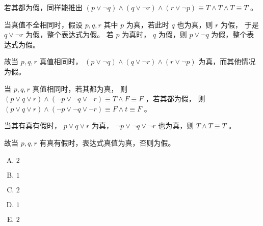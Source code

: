 {{\begin{practices}
            若其都为假，同样能推出 $(p \vee \neg q) \wedge (q \vee \neg r) \wedge (r \vee \neg p) \equiv T \wedge T \wedge T \equiv T$ 。

            当真值不全相同时，假设 $p, q, r$ 其中 $p$ 为真，若此时 $q$ 也为真，则 $r$ 为假， 于是 $q \vee \neg r$ 为假，整个表达式为假。
            若 $p$ 为真时， $q$ 为假，则 $p \vee \neg q$ 为假，整个表达式为假。

            故当 $p, q, r$ 真值相同时， $(p \vee \neg q) \wedge (q \vee \neg r) \wedge (r \vee \neg p)$ 为真，而其他情况为假。
        \end{practices}

        \begin{practices}
            当 $p, q, r$ 真值相同时，若其都为真， 则 $(p \vee q \vee r) \wedge (\neg p \vee \neg q \vee \neg r) \equiv T \wedge F \equiv F$ ，若其都为假， 则  $(p \vee q \vee r) \wedge (\neg p \vee \neg q \vee \neg r) \equiv F \wedge t \equiv F$ 。

            当其有真有假时， $p \vee q \vee r$ 为真， $\neg p \vee \neg q \vee \neg r$ 也为真，则 $T \wedge T \equiv T$ 。
            
            故当 $p, q, r$ 有真有假时，表达式真值为真，否则为假。
        \end{practices}

        \begin{practices}
            \begin{enumerate}[A.]
                \item $2$
                \item $1$
                \item $2$
                \item $1$
                \item $2$
            \end{enumerate}
        \end{practices}

}}
